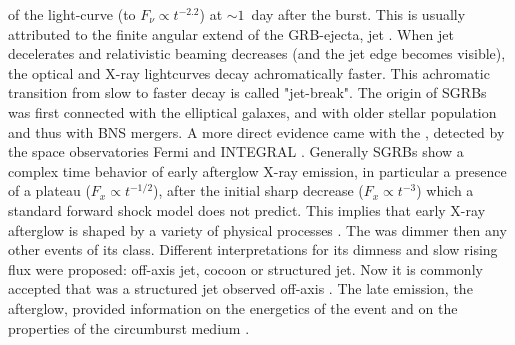 of the light-curve (to $F_{\nu}\propto t^{-2.2}$) at $\sim 1$~day after the burst. 
This is usually attributed to the 
finite angular extend of the \ac{GRB}-ejecta, jet \citep[\eg][]{Rhoads:1999wm,Sari:1999mr}. 
When jet decelerates and relativistic beaming decreases (and the jet edge becomes visible), 
the optical and X-ray lightcurves decay achromatically faster. This achromatic transition 
from slow to faster decay is called "jet-break".
%
%
The origin of \acp{SGRB} was first connected with the elliptical galaxes, and with 
older stellar population 
\citep[\eg][]{Gehrels:2005qk,Fox:2005kv,Barthelmy:2005bx,Berger:2005dr,Panaitescu:2005er,Bloom:2005qx,Guetta:2005bb,Nakar:2007yr} 
and thus with \ac{BNS} mergers. A more direct evidence came with the \GRB{}
\citep{Savchenko:2017ffs,Alexander:2017aly,Troja:2017nqp,Monitor:2017mdv,Nynka:2018vup,Hajela:2019mjy}, 
detected by the space observatories Fermi \citep{TheFermi-LAT:2015kwa} and INTEGRAL \citep{Winkler:2011}.
%
Generally \acp{SGRB} show a complex time behavior of early afterglow X-ray emission, 
in particular a presence of a plateau ($F_{x}\propto t^{-1/2}$), after the initial sharp 
decrease ($F_{x}\propto t^{-3}$) which a standard forward shock model does not predict. 
This implies that early X-ray afterglow is shaped by a variety of physical processes 
\citep{Zhang:2005fa}.
%
The \GRB{} was dimmer then any other events of its class. 
Different interpretations for its dimness and slow rising flux were proposed: off-axis jet, 
cocoon or structured jet. Now it is commonly accepted that \GRB{} was a structured jet 
observed off-axis 
\citep[\eg][]{Fong:2017ekk,Troja:2017nqp,Margutti:2018xqd,Lamb:2017ych,Lamb:2018ohw,Ryan:2019fhz,Alexander:2018dcl,Mooley:2018dlz,Ghirlanda:2018uyx}.
The \GRB{} late emission, the afterglow, provided information on 
the energetics of the event and on the properties of the circumburst medium 
\citep[\eg][]{Hajela:2019mjy}. 

